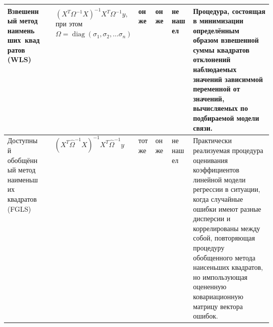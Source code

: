 \documentclass[10pt,a4paper]{article}
\DeclareMathOperator{\diag}{diag}  %
\begin{document}
\begin{table}[H]
{\begin{tabular}{|m{0.15\linewidth}|m{0.17\linewidth}|Z|Y{0.1}|Y{0.18}|m{0.3\linewidth}|}
Взвешенный метод \newline наименьших~квадратов (WLS) & 
\begin{eqnarray*} & (X^T \Omega^{-1} X)^{-1}  X^T \Omega^{-1} y,\\
& \textit{при этом } \\
& \Omega = \diag(\sigma_1,\sigma_2, \ldots \sigma_n) \end{eqnarray*}  & он же & он же & не нашел & Процедура, состоящая в минимизации определённым образом взвешенной суммы квадратов отклонений наблюдаемых значений зависиммой переменной от значений, вычисляемых по подбираемой модели \newline связи. \\
\hline

Доступный обобщённый \newline метод наименьших \newline квадратов (FGLS) & \[(X^T \hat{\Omega}^{-1} X)^{-1}X^T \hat{\Omega}^{-1} y\] & тот же  & он же  &  не нашел  & Практически реализуемая процедура оценивания коэффициентов линейной модели регрессии в ситуации, когда случайные ошибки имеют разные дисперсии и коррелированы между собой, повторяющая процедуру обобщенного метода наисеньших квадратов, но импользующая оцененную ковариационную \newline матрицу вектора ошибок. \\
\hline


\end{tabular}}
\end{table}
\end{document}
